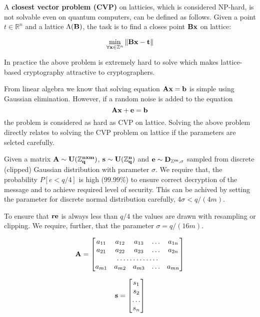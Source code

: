 A { \bf closest vector problem (CVP) } on latticies, which is considered NP-hard, is not solvable even on 
quantum computers, can be defined as follows. Given a point $t \in \mathbb{R}^n$ and a lattice
$\Lambda({\bf B})$, the task is to find a closes point ${\bf Bx}$ on lattice: 

$$\min_{\forall {\bf x} \in \mathbb{Z}^n} \|{\bf Bx} - {\bf t}\|$$ 

In practice the above problem is extremely hard to solve which makes lattice-based cryptography 
attractive to cryptographers.

From linear algebra we know that solving equation $\bf{Ax}=\bf{b}$ is simple using
Gaussian elimination. However, if a random noise is added to the equation $$\bf{Ax} + \bf{e} = \bf{b}$$ the 
problem is considered as hard as CVP on lattice. Solving the above problem directly relates to 
solving the CVP problem on lattice if the parameters are selcted carefully.

Given a matrix $\bf{A} \sim U(\mathbb{Z}^{nxm}_q)$, $\bf{s} \sim U(\mathbb{Z}^{n}_q)$ and $\bf{e} \sim D_{\mathbb{Z}^{m}, \sigma}$ 
sampled from discrete (clipped) Gaussian distribution with parameter $\sigma$. We require that, the probability
$P[e < q/4]$ is high (\ie $99.99\%$) to ensure correct decryption of the message and to achieve required 
level of security. This can be achived by setting the parameter for discrete normal distribution carefully, \ie $4\sigma < q/(4m)$.

To ensure that $\bf{re}$ is always less than $q/4$ the values are drawn with resampling
or clipping. We require, further, that the parameter $\sigma = q/(16m)$.

\begin{equation}
    {\bf A}=\begin{bmatrix}
        a_{11}       & a_{12} & a_{13} & \dots & a_{1n} \\
        a_{21}       & a_{22} & a_{23} & \dots & a_{2n} \\
        \hdotsfor{5} \\
        a_{m1}       & a_{m2} & a_{m3} & \dots & a_{mn}
    \end{bmatrix}
\end{equation}

\begin{equation}
    {\bf s}=\begin{bmatrix}
        s_{1} \\
        s_{2} \\
        \dots \\
        s_{n} 
    \end{bmatrix}
\end{equation}

